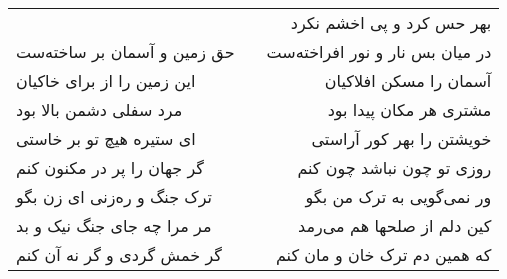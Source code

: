 \begin{center}
\begin{longtable}{l p{0.5cm} r}
&&
بهر حس کرد و پی اخشم نکرد
\\
حق زمین و آسمان بر ساخته‌ست
&&
در میان بس نار و نور افراخته‌ست
\\
این زمین را از برای خاکیان
&&
آسمان را مسکن افلاکیان
\\
مرد سفلی دشمن بالا بود
&&
مشتری هر مکان پیدا بود
\\
ای ستیره هیچ تو بر خاستی
&&
خویشتن را بهر کور آراستی
\\
گر جهان را پر در مکنون کنم
&&
روزی تو چون نباشد چون کنم
\\
ترک جنگ و ره‌زنی ای زن بگو
&&
ور نمی‌گویی به ترک من بگو
\\
مر مرا چه جای جنگ نیک و بد
&&
کین دلم از صلحها هم می‌رمد
\\
گر خمش گردی و گر نه آن کنم
&&
که همین دم ترک خان و مان کنم
\\
\end{longtable}
\end{center}
